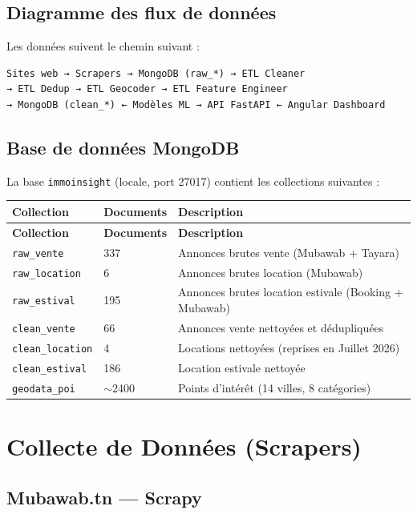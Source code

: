 \documentclass[12pt,a4paper]{report}
\begin{document}
\section{Diagramme des flux de données}

Les données suivent le chemin suivant :

\begin{verbatim}
Sites web → Scrapers → MongoDB (raw_*) → ETL Cleaner
→ ETL Dedup → ETL Geocoder → ETL Feature Engineer
→ MongoDB (clean_*) ← Modèles ML → API FastAPI ← Angular Dashboard
\end{verbatim}

\section{Base de données MongoDB}

La base \texttt{immoinsight} (locale, port 27017) contient les collections suivantes :

\begin{longtable}{lll}
\toprule
\textbf{Collection} & \textbf{Documents} & \textbf{Description} \\
\midrule
\endfirsthead
\toprule
\textbf{Collection} & \textbf{Documents} & \textbf{Description} \\
\midrule
\endhead
\bottomrule
\endfoot
\texttt{raw\_vente} & 337 & Annonces brutes vente (Mubawab + Tayara) \\
\texttt{raw\_location} & 6 & Annonces brutes location (Mubawab) \\
\texttt{raw\_estival} & 195 & Annonces brutes location estivale (Booking + Mubawab) \\
\texttt{clean\_vente} & 66 & Annonces vente nettoyées et dédupliquées \\
\texttt{clean\_location} & 4 & Locations nettoyées (reprises en Juillet 2026) \\
\texttt{clean\_estival} & 186 & Location estivale nettoyée \\
\texttt{geodata\_poi} & $\sim$2400 & Points d'intérêt (14 villes, 8 catégories) \\
\bottomrule
\end{longtable}

\chapter{Collecte de Données (Scrapers)}

\section{Mubawab.tn — Scrapy}
\end{document}

